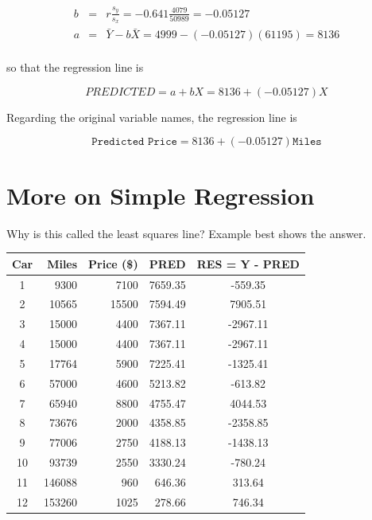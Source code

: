 \documentclass[11pt, chapterprefix=true]{scrbook}\usepackage[]{graphicx}\usepackage[]{color}
\begin{document}
\begin{eqnarray*}
b &=& r \frac{s_y}{s_x} = -0.641 \frac{4079}{50989} = -0.05127 \\
a &=& \bar{Y} - b \bar{X} = 4999 - (-0.05127)(61195) = 8136  \\
\end{eqnarray*}

so that the regression line is

\begin{equation*}
PREDICTED = a + b X = 8136 + (-0.05127) X
\end{equation*}

Regarding the original variable names, the regression line is

\begin{equation*}
  \texttt{Predicted Price} = 8136 + (-0.05127) \texttt{Miles} 
\end{equation*}

\section{More on Simple Regression}

Why is this called the least squares line?  Example best shows the answer.

\begin{table}[ht]


\centering 
\begin{tabular}{@{} c rrrc @{}} \hline 
Car & Miles & Price (\$) & PRED & RES = Y - PRED    \\ \hline
1 & 9300 & 7100 & 7659.35 & -559.35 \\
2 & 10565 & 15500 & 7594.49 & 7905.51 \\
3 & 15000 & 4400 & 7367.11 & -2967.11 \\
4 & 15000 & 4400 & 7367.11 & -2967.11 \\
5 & 17764 & 5900 & 7225.41 & -1325.41 \\
6 & 57000 & 4600 & 5213.82 & -613.82 \\
7 & 65940 & 8800 & 4755.47 & 4044.53 \\
8 & 73676 & 2000 & 4358.85 & -2358.85 \\
9 & 77006 & 2750 & 4188.13 & -1438.13 \\
10 & 93739 & 2550 & 3330.24 & -780.24 \\
11 & 146088 & 960 & 646.36 & 313.64 \\
12 & 153260 & 1025 & 278.66 & 746.34 \\ \hline
\end{tabular}
\end{table}
\end{document}
